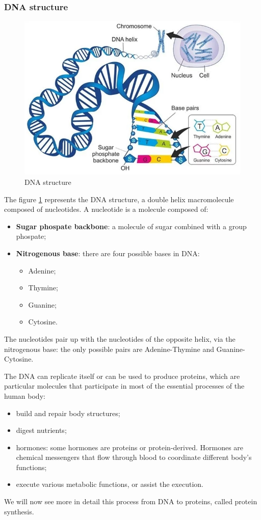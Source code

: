 \subsubsection{DNA structure}

\begin{figure}[h!]
	\includegraphics[scale=.6]{res/proteins_overview/dna_basepairs.png}
	\centering
	\caption{DNA structure}
	\label{fig:dna-structure}
\end{figure}

The figure \ref{fig:dna-structure} represents the DNA structure, a double helix macromolecule composed of nucleotides. A nucleotide is a molecule composed of:
\begin{itemize}
	\item \textbf{Sugar phospate backbone}: a molecule of sugar combined with a group phospate;
	\item \textbf{Nitrogenous base}: there are four possible bases in DNA:
	\begin{itemize}
		\item Adenine;
		\item Thymine;
		\item Guanine;
		\item Cytosine.
	\end{itemize}
\end{itemize}
The nucleotides pair up with the nucleotides of the opposite helix, via the nitrogenous base: the only possible pairs are Adenine-Thymine and Guanine-Cytosine.

\pagebreak

The DNA can replicate itself or can be used to produce proteins, which are particular molecules that participate in most of the essential processes of the human body:
\begin{itemize}
	\item build and repair body structures;
	\item digest nutrients;
	\item hormones: some hormones are proteins or protein-derived. Hormones are chemical messengers that flow through blood to coordinate different body's functions;
	\item execute various metabolic functions, or assist the execution.
\end{itemize}
We will now see more in detail this process from DNA to proteins, called protein synthesis.

